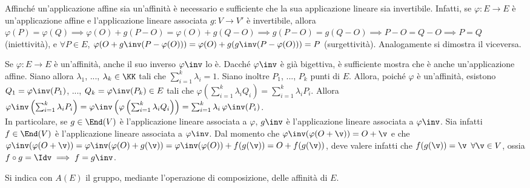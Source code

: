 \documentclass[11pt]{article}
\begin{document}
	\begin{remark}
		Affinché un'applicazione affine sia un'affinità è necessario e sufficiente che la sua applicazione
		lineare sia invertibile. Infatti, se $\varphi : E \to E$ è un'applicazione affine e l'applicazione
		lineare associata $g : V \to V'$ è invertibile, allora $\varphi(P) = \varphi(Q) \implies \varphi(O) + g(P - O) = \varphi(O) + g(Q - O) \implies g(P-O) = g(Q-O) \implies P-O = Q-O \implies P=Q$ (iniettività), e $\forall P \in E$,
		$\varphi(O + g\inv(P-\varphi(O))) = \varphi(O) + g(g\inv(P-\varphi(O))) = P$ (surgettività). Analogamente
		si dimostra il viceversa.
	\end{remark}

	\begin{remark}
		Se $\varphi : E \to E$ è un'affinità, anche il suo inverso $\varphi\inv$
		lo è. Dacché $\varphi\inv$ è già bigettiva, è sufficiente mostra
		che è anche un'applicazione affine. Siano allora $\lambda_1$, ...,
		$\lambda_k \in \KK$ tali che $\sum_{i=1}^k \lambda_i = 1$. Siano
		inoltre $P_1$, ..., $P_k$ punti di $E$. Allora, poiché $\varphi$
		è un'affinità, esistono $Q_1 = \varphi\inv(P_1)$, ..., $Q_k = \varphi\inv(P_k) \in E$ tali che
		$\varphi\left( \sum_{i=1}^k \lambda_i Q_i \right) = \sum_{i=1}^k \lambda_i P_i$. Allora $\varphi\inv\left( \sum_{i=1}^k \lambda_i P_i \right) = \varphi\inv\left(\varphi\left( \sum_{i=1}^k \lambda_i Q_i \right)\right) = \sum_{i=1}^k \lambda_i \, \varphi\inv(P_i)$. \\
		
		In particolare, se $g \in \End(V)$ è l'applicazione lineare associata
		a $\varphi$, $g\inv$ è l'applicazione lineare associata a $\varphi\inv$.
		Sia infatti $f \in \End(V)$ è l'applicazione lineare associata
		a $\varphi\inv$. Dal momento che $\varphi\inv(\varphi(O + \v)) = O + \v$
		e che $\varphi\inv(\varphi(O + \v)) = \varphi\inv(\varphi(O) + g(\v)) =
		\varphi\inv(\varphi(O)) + f(g(\v)) = O + f(g(\v))$, deve valere infatti
		che $f(g(\v)) = \v$ $\forall \v \in V$, ossia $f \circ g = \Idv \implies f = g\inv$.
	\end{remark}
	
	\begin{definition}  Si indica con $A(E)$ il gruppo,
		mediante l'operazione di composizione, delle affinità di $E$.
	\end{definition}
	
\end{document}
